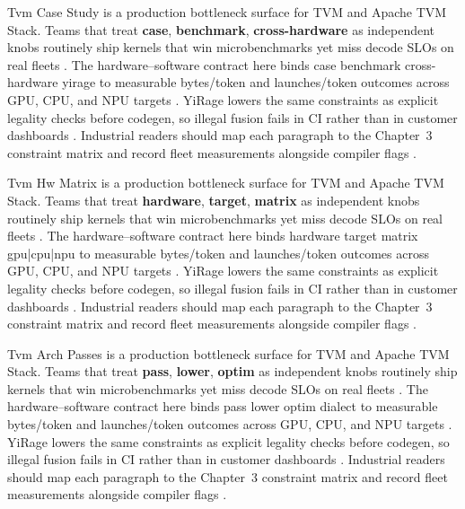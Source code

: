 Tvm Case Study is a production bottleneck surface for TVM and Apache TVM Stack. Teams that treat \textbf{case}, \textbf{benchmark}, \textbf{cross-hardware} as independent knobs routinely ship kernels that win microbenchmarks yet miss decode SLOs on real fleets \citep{semianalysis2024tma,dlbook}. The hardware--software contract here binds case benchmark cross-hardware yirage to measurable bytes/token and launches/token outcomes across GPU, CPU, and NPU targets \citep{amd2024xdna,dao2022flashattention}. YiRage lowers the same constraints as explicit legality checks before codegen, so illegal fusion fails in CI rather than in customer dashboards \citep{amd2024aie,kwon2023vllm}. Industrial readers should map each paragraph to the Chapter~3 constraint matrix and record fleet measurements alongside compiler flags \citep{dlbook,nvidia2024cudagraphs}.

Tvm Hw Matrix is a production bottleneck surface for TVM and Apache TVM Stack. Teams that treat \textbf{hardware}, \textbf{target}, \textbf{matrix} as independent knobs routinely ship kernels that win microbenchmarks yet miss decode SLOs on real fleets \citep{amd2024xdna,dao2022flashattention}. The hardware--software contract here binds hardware target matrix gpu|cpu|npu to measurable bytes/token and launches/token outcomes across GPU, CPU, and NPU targets \citep{amd2024aie,kwon2023vllm}. YiRage lowers the same constraints as explicit legality checks before codegen, so illegal fusion fails in CI rather than in customer dashboards \citep{dlbook,nvidia2024cudagraphs}. Industrial readers should map each paragraph to the Chapter~3 constraint matrix and record fleet measurements alongside compiler flags \citep{dao2022flashattention,liu2024deepseekv3}.

Tvm Arch Passes is a production bottleneck surface for TVM and Apache TVM Stack. Teams that treat \textbf{pass}, \textbf{lower}, \textbf{optim} as independent knobs routinely ship kernels that win microbenchmarks yet miss decode SLOs on real fleets \citep{amd2024aie,kwon2023vllm}. The hardware--software contract here binds pass lower optim dialect to measurable bytes/token and launches/token outcomes across GPU, CPU, and NPU targets \citep{dlbook,nvidia2024cudagraphs}. YiRage lowers the same constraints as explicit legality checks before codegen, so illegal fusion fails in CI rather than in customer dashboards \citep{dao2022flashattention,liu2024deepseekv3}. Industrial readers should map each paragraph to the Chapter~3 constraint matrix and record fleet measurements alongside compiler flags \citep{kwon2023vllm,patel2025llminference}.

